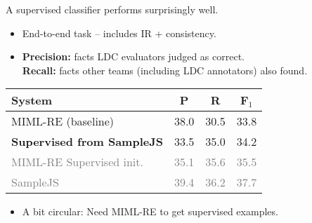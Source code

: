 \def\grey#1{\textcolor{gray}{#1}}
\begin{frame}{A supervised classifier performs surprisingly well.}
\begin{itemize}
  \item End-to-end task -- includes IR + consistency.
\item \textbf{Precision:} facts LDC evaluators judged as correct. \\
      \textbf{Recall:} facts other teams (including LDC annotators) also found.
\end{itemize}
\vspace{0.25cm}

\begin{center}
  \begin{tabular}{lccc}
    \textbf{System} & \textbf{P} & \textbf{R} & \textbf{F$_1$} \\
    \hline
    MIML-RE (baseline)       & 38.0          & 30.5          & 33.8 \pause \\
    \textbf{Supervised from SampleJS}      & 33.5          & 35.0 & 34.2 \pause \\
    \hline
    \grey{MIML-RE Supervised init.} & \grey{35.1}   & \grey{35.6}   & \grey{35.5} \\
    \grey{SampleJS}          & \grey{39.4}   & \grey{36.2}   & \grey{37.7} \\
  \end{tabular}
\end{center}
\pause

\begin{itemize}
  \item A bit circular: Need MIML-RE to get supervised examples.
\end{itemize}
\end{frame}
